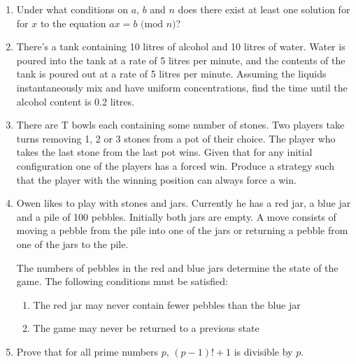 \documentclass[a4paper]{article}
\begin{document}
\begin{enumerate}
    \item
    Under what conditions on $a$, $b$ and $n$ does there exist at least one solution for for $x$ to the equation $ax = b \text{ (mod } n\text{)}$?
    
    \item
    There's a tank containing 10 litres of alcohol and 10 litres of water. Water is poured into the tank at a rate of 5 litres per minute, and the contents of the tank is poured out at a rate of 5 litres per minute. Assuming the liquids instantaneously mix and have uniform concentrations, find the time until the alcohol content is 0.2 litres.
    
    \item
    There are T bowls each containing some number of stones. Two players take turns removing 1, 2 or 3 stones from a pot of their choice. The player who takes the last stone from the last pot wins. Given that for any initial configuration one of the players has a forced win. Produce a strategy such that the player with the winning position can always force a win.
    
    \item
    Owen likes to play with stones and jars. Currently he has a red jar, a blue jar and a pile of 100 pebbles. Initially both jars are empty. A move consists of moving a pebble from the pile into one of the jars or returning a pebble from one of the jars to the pile.
    
    The numbers of pebbles in the red and blue jars determine the state of the game. The following conditions must be satisfied:
    
    \begin{enumerate}
        \item The red jar may never contain fewer pebbles than the blue jar
        \item The game may never be returned to a previous state
    \end{enumerate}
    
    \item
    Prove that for all prime numbers $p$, $(p-1)! + 1$ is divisible by $p$.
    
    
    
    
    
    
\end{enumerate}
\end{document}
